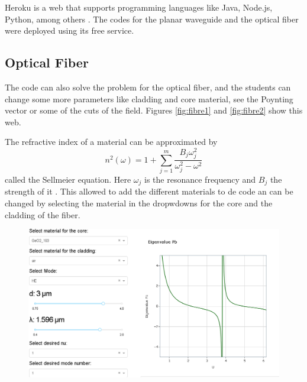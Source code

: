         
        Heroku is a web that supports programming languages like Java, Node.js, Python, among others \cite{heorku}. The codes for the planar waveguide and the optical fiber were deployed using its free service.

    \subsection{Optical Fiber}
    
        The code can also solve the problem for the optical fiber, and the students can change some more parameters like cladding and core material, see the Poynting vector or some of the cuts of the field. Figures \ref{fig:fibre1} and \ref{fig:fibre2} show this web. 
        
        
        The refractive index of a material can be approximated by 
        \begin{equation}
            n^2 (\omega) = 1 + \sum_{j=1}^{m} \frac{B_j\omega^2_j}{\omega^2_j - \omega^2} 
            \label{eq_ene}
        \end{equation}
        called the Sellmeier equation. Here $\omega_j$ is the resonance frequency and $B_j$ the strength of it \citep{AgrawalBook}. This allowed to add the different materials to de code an can be changed by selecting the material in the dropwdowns for the core and the cladding of the fiber.
        
        
        \begin{figure}[label={fig:fibre1}, caption={\href{https://fiber-mode-app.herokuapp.com/apps/results}{Heroku app} for the optical fiber (1).}]
        	\includegraphics[width=.8\textwidth]{figures/chap2/fibre1.PNG} 
        \end{figure}
        
